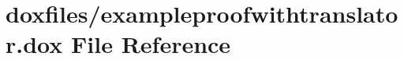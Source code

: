 \hypertarget{exampleproofwithtranslator_8dox}{}\section{doxfiles/exampleproofwithtranslator.dox File Reference}
\label{exampleproofwithtranslator_8dox}
